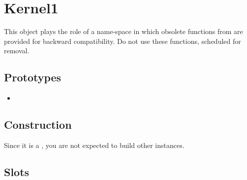 \section{Kernel1}

This object plays the role of a name-space in which obsolete functions
from  are provided for backward compatibility.  Do not use
these functions, scheduled for removal.

\subsection{Prototypes}
\begin{itemize}
\item {}
\end{itemize}

\subsection{Construction}

Since it is a , you are not expected to build
other instances.

\subsection{Slots}

